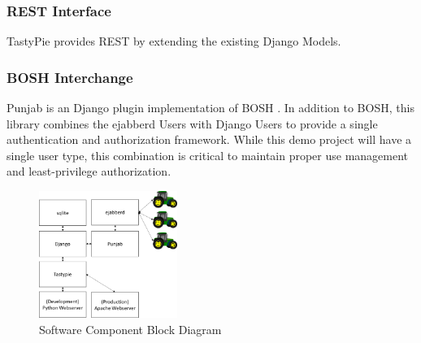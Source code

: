 \documentclass[conference,12pt]{IEEEtran}
\begin{document}
\subsubsection{REST Interface}
TastyPie provides REST \autocite{_toastdriven/django-tastypie_2014} by extending
the existing Django Models.
\subsubsection{BOSH Interchange}
Punjab is an Django plugin implementation of BOSH
\autocite{_twonds/punjab_2014}.  In addition to BOSH, this library combines
the ejabberd Users with Django Users to provide a single authentication and
authorization framework. While this demo project will have a single user type,
this combination is critical to maintain proper use management and
least-privilege authorization.

\begin{figure}
\centering
\includegraphics[width=0.4\textwidth]{SoftwareComponentBlockDiagram.pdf}
\caption{Software Component Block Diagram}
\label{fig:softwarecomponents}
\end{figure}
\end{document}
